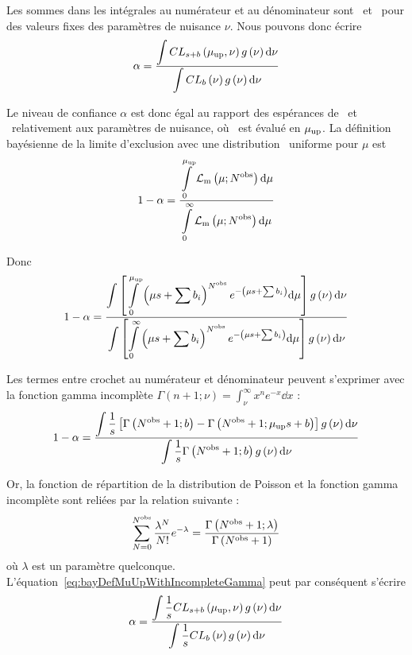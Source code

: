 Les sommes dans les int\'egrales au num\'erateur et au d\'enominateur sont \CLsb~et \CLb~pour des valeurs fixes des param\`etres de nuisance $\nu$. Nous pouvons donc \'ecrire
\begin{equation}
\label{eq:demoMuUpFromCLsWithUncert}
\alpha=\frac{\displaystyle\int CL_{s+b}\left(\mu_{\text{up}},\nu\right)g\left(\nu\right){\rm d}\nu}{\displaystyle\int CL_b\left(\nu\right)g\left(\nu\right){\rm d}\nu}
\end{equation}

Le niveau de confiance $\alpha$ est donc \'egal au rapport des esp\'erances de \CLsb~et \CLb~relativement aux param\`etres de nuisance, o\`u \CLsb~est \'evalu\'e en $\mu_{\text{up}}$. La d\'efinition bay\'esienne de la limite d'exclusion avec une distribution \prior~uniforme pour $\mu$ est
\[1-\alpha=\frac{\displaystyle\int\limits_{0}^{\mu_{\text{up}}}{\cal L}_\text{m}\left(\mu;N^{\text{obs}}\right){\rm d}\mu}{\displaystyle\int\limits_{0}^{\infty}{\cal L}_\text{m}\left(\mu;N^{\text{obs}}\right){\rm d}\mu}\]

Donc
\[1-\alpha=\frac{\displaystyle\int\left[\displaystyle\int\limits_{0}^{\mu_{\text{up}}}\left(\mu s+\sum b_i\right)^{N^{\text{obs}}}e^{-\left(\mu s+\sum b_i\right)}{\rm d}\mu\right]g\left(\nu\right){\rm d}\nu}{\displaystyle\int\left[\displaystyle\int\limits_{0}^{\infty}\left(\mu s+\sum b_i\right)^{N^{\text{obs}}}e^{-\left(\mu s+\sum b_i\right)}{\rm d}\mu\right]g\left(\nu\right){\rm d}\nu}\]

Les termes entre crochet au num\'erateur et d\'enominateur peuvent s'exprimer avec la fonction gamma incompl\`ete $\Gamma\left(n+1;\nu\right)=\displaystyle\int_\nu^\infty x^ne^{-x}\dd x$ :
\begin{equation}
\label{eq:bayDefMuUpWithIncompleteGamma}
1-\alpha=\frac{\displaystyle\int\frac{1}{s}\left[\Gamma\left(N^{\text{obs}}+1;b\right)-\Gamma\left(N^{\text{obs}}+1;\mu_{\text{up}} s+b\right)\right]g\left(\nu\right){\rm d}\nu}{\displaystyle\int\frac{1}{s}\Gamma\left(N^{\text{obs}}+1;b\right)g\left(\nu\right){\rm d}\nu}
\end{equation}

Or, la fonction de r\'epartition de la distribution de Poisson et la fonction gamma incompl\`ete sont reli\'ees par la relation suivante :
\[\sum\limits_{N=0}^{N^{\text{obs}}}\frac{\lambda^N}{N!}e^{-\lambda}=\frac{\Gamma\left(N^{\text{obs}}+1;\lambda\right)}{\Gamma\left(N^{\text{obs}}+1\right)}\]
o\`u $\lambda$ est un param\`etre quelconque. L'\'equation~\ref{eq:bayDefMuUpWithIncompleteGamma} peut par cons\'equent s'\'ecrire
\begin{equation}
\label{eq:demoMuUpFromBayesian}
\alpha=\frac{\displaystyle\int\frac{1}{s}CL_{s+b}\left(\mu_{\text{up}},\nu\right)g\left(\nu\right){\rm d}\nu}{\displaystyle\int\frac{1}{s}CL_b\left(\nu\right)g\left(\nu\right){\rm d}\nu}
\end{equation}

